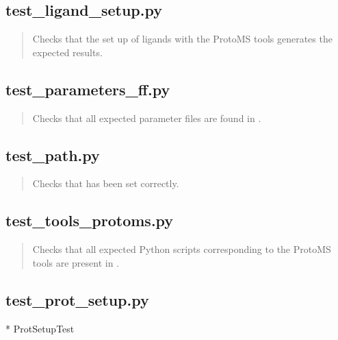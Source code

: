 \documentclass[letterpaper,10pt,english]{sphinxmanual}
\begin{document}
\subsection{test\_ligand\_setup.py}
\label{\detokenize{testsuite:test-ligand-setup-py}}
\begin{quote}

Checks that the set up of ligands with the ProtoMS tools generates the expected results.
\end{quote}

\begin{quote}

\end{quote}


\subsection{test\_parameters\_ff.py}
\label{\detokenize{testsuite:test-parameters-ff-py}}
\begin{quote}

Checks that all expected parameter files are found in .
\end{quote}


\subsection{test\_path.py}
\label{\detokenize{testsuite:test-path-py}}
\begin{quote}

Checks that  has been set correctly.
\end{quote}


\subsection{test\_tools\_protoms.py}
\label{\detokenize{testsuite:test-tools-protoms-py}}
\begin{quote}

Checks that all expected Python scripts corresponding to the ProtoMS tools are present in .
\end{quote}


\subsection{test\_prot\_setup.py}
\label{\detokenize{testsuite:test-prot-setup-py}}
* ProtSetupTest
\end{document}
